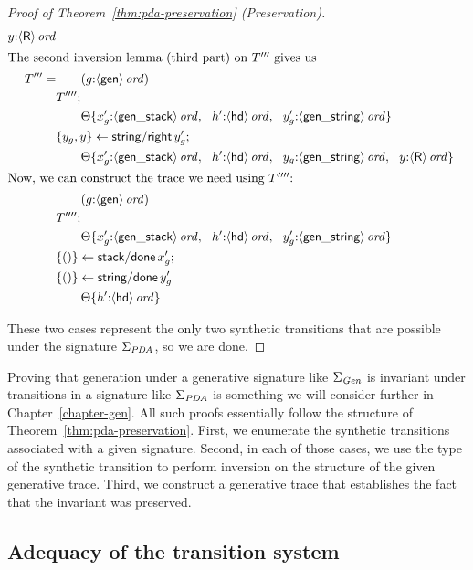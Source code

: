 \begin{proof}[Proof of Theorem~\ref{thm:pda-preservation} (Preservation)]
\begin{align*}
{                   y{:}{\langle {\sf R} \rangle}\,{{\it ord}}}\\
\intertext{The second inversion lemma (third part) on $T'''$ gives us}
T''' = & \qquad ({g{:}{\langle {\sf gen} \rangle}\,{{\it ord}}})\\
& T'''';\\
& \qquad {\Theta}\{{x_g'{:}{\langle {\sf gen\_stack} \rangle}\,{{\it ord}}, ~~
                   h'{:}{\langle {\sf hd} \rangle}\,{{\it ord}}, ~~
                   y_g'{:}{\langle {\sf gen\_string} \rangle}\,{{\it ord}}}\}\\
& \{{y_g, y}\} \leftarrow {{\sf string/right}\,y_g'};\\
& \qquad {\Theta}\{{x_g'{:}{\langle {\sf gen\_stack} \rangle}\,{{\it ord}}, ~~
                   h'{:}{\langle {\sf hd} \rangle}\,{{\it ord}}, ~~
                   y_g{:}{\langle {\sf gen\_string} \rangle}\,{{\it ord}}, ~~
                   y{:}{\langle {\sf R} \rangle}\,{{\it ord}}}\}\\
\intertext{Now, we can construct the trace we need using $T''''$:}
& \qquad ({g{:}{\langle {\sf gen} \rangle}\,{{\it ord}}})\\
& T'''';\\
& \qquad {\Theta}\{{x_g'{:}{\langle {\sf gen\_stack} \rangle}\,{{\it ord}}, ~~
                   h'{:}{\langle {\sf hd} \rangle}\,{{\it ord}}, ~~
                   y_g'{:}{\langle {\sf gen\_string} \rangle}\,{{\it ord}}}\}\\
& \{{()}\} \leftarrow {{\sf stack/done}\,x_g'};\\
& \{{()}\} \leftarrow {{\sf string/done}\,y_g'}\\
& \qquad {\Theta}\{{h'{:}{\langle {\sf hd} \rangle}\,{{\it ord}}}\}
\end{align*}

\noindent
These two cases represent the only two synthetic transitions that are possible
under the signature $\Sigma_{\it PDA}$, so we are done.
\end{proof}

Proving that generation under a generative signature like $\Sigma_{\it
  Gen}$ is invariant under transitions in a signature like
$\Sigma_{\it PDA}$ is something we will consider further
in Chapter~\ref{chapter-gen}.  
All such proofs essentially follow the structure of
Theorem~\ref{thm:pda-preservation}. First, we enumerate the synthetic
transitions associated with a given signature. Second, in each of those
cases, we use the type of the synthetic transition to perform
inversion on the structure of the given generative trace.
Third, we construct a generative
trace that establishes the fact that the invariant was preserved.

\subsection{Adequacy of the transition system}
\label{sec:pda-adequacy}

